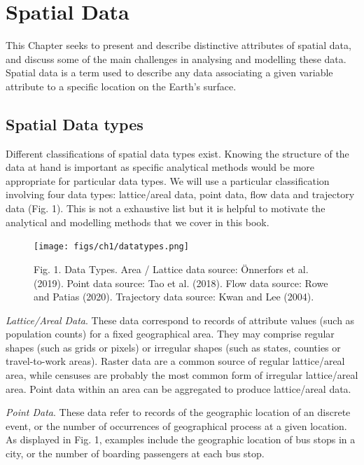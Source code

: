 \documentclass[
  letterpaper,
  DIV=11,
  numbers=noendperiod,
  oneside]{scrreprt}
\begin{document}
\chapter{Spatial Data}\label{spatial_data}

This Chapter seeks to present and describe distinctive attributes of
spatial data, and discuss some of the main challenges in analysing and
modelling these data. Spatial data is a term used to describe any data
associating a given variable attribute to a specific location on the
Earth's surface.

\section{Spatial Data types}\label{spatial-data-types}

Different classifications of spatial data types exist. Knowing the
structure of the data at hand is important as specific analytical
methods would be more appropriate for particular data types. We will use
a particular classification involving four data types: lattice/areal
data, point data, flow data and trajectory data (Fig. 1). This is not a
exhaustive list but it is helpful to motivate the analytical and
modelling methods that we cover in this book.

\begin{figure}[H]

{\centering \texttt{[image: figs/ch1/datatypes.png]}

}

\caption{Fig. 1. Data Types. Area / Lattice data source: Önnerfors et
al. (2019). Point data source: Tao et al. (2018). Flow data source: Rowe
and Patias (2020). Trajectory data source: Kwan and Lee (2004).}

\end{figure}%

\emph{Lattice/Areal Data}. These data correspond to records of attribute
values (such as population counts) for a fixed geographical area. They
may comprise regular shapes (such as grids or pixels) or irregular
shapes (such as states, counties or travel-to-work areas). Raster data
are a common source of regular lattice/areal area, while censuses are
probably the most common form of irregular lattice/areal area. Point
data within an area can be aggregated to produce lattice/areal data.

\emph{Point Data}. These data refer to records of the geographic
location of an discrete event, or the number of occurrences of
geographical process at a given location. As displayed in Fig. 1,
examples include the geographic location of bus stops in a city, or the
number of boarding passengers at each bus stop.
\end{document}
